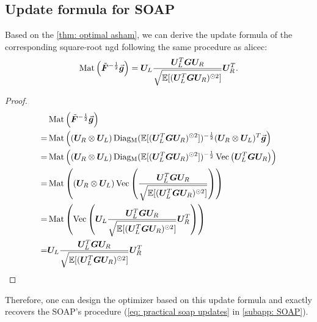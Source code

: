 \subsection{Update formula for SOAP}
\label{subapp: update formula for SOAP}
Based on the \cref{thm: optimal asham}, we can derive the update formula of the corresponding square-root \gls{ngd} following the same procedure as \gls{alicec}:
\begin{align*}
    \operatorname{Mat}\left(\tilde{\bm{F}}^{-\frac{1}{2}}\vec{\bm{g}}\right) = {\bm{U}}_L\frac{{\bm{U}}_L^T{\bm{G}}{\bm{U}}_R}{\sqrt{\mathbb{E}[({\bm{U}}_L^T{\bm{G}}{\bm{U}}_R)^{\odot 2}]}}{\bm{U}}_R^T.
\end{align*}
\begin{proof}
    \begin{align*}
        &\operatorname{Mat}\left(\tilde{\bm{F}}^{-\frac{1}{2}}\vec{\bm{g}}\right)\\
        =&\operatorname{Mat}\left(({\bm{U}}_R\otimes{\bm{U}}_L)\operatorname{Diag_M}(\mathbb{E}[({\bm{U}}_L^T{\bm{G}}{\bm{U}}_R)^{\odot 2}])^{-\frac{1}{2}}({\bm{U}}_R\otimes{\bm{U}}_L)^T\vec{\bm{g}}\right)\\
        =&\operatorname{Mat}\left(({\bm{U}}_R\otimes{\bm{U}}_L)\operatorname{Diag_M}(\mathbb{E}[({\bm{U}}_L^T{\bm{G}}{\bm{U}}_R)^{\odot 2}])^{-\frac{1}{2}}\operatorname{Vec}\left({\bm{U}}_L^T{\bm{G}}{\bm{U}}_R\right)\right)\\
        =&\operatorname{Mat}\left(({\bm{U}}_R\otimes{\bm{U}}_L)\operatorname{Vec}\left(\frac{{\bm{U}}_L^T{\bm{G}}{\bm{U}}_R}{\sqrt{\mathbb{E}[({\bm{U}}_L^T{\bm{G}}{\bm{U}}_R)^{\odot 2}]}}\right)\right)\\
        =&\operatorname{Mat}\left(\operatorname{Vec}\left({\bm{U}}_L\frac{{\bm{U}}_L^T{\bm{G}}{\bm{U}}_R}{\sqrt{\mathbb{E}[({\bm{U}}_L^T{\bm{G}}{\bm{U}}_R)^{\odot 2}]}}{\bm{U}}_R^T\right)\right)\\
        =&{\bm{U}}_L\frac{{\bm{U}}_L^T{\bm{G}}{\bm{U}}_R}{\sqrt{\mathbb{E}[({\bm{U}}_L^T{\bm{G}}{\bm{U}}_R)^{\odot 2}]}}{\bm{U}}_R^T
    \end{align*}
\end{proof}
Therefore, one can design the optimizer based on this update formula and exactly recovers the SOAP's procedure (\cref{eq: practical soap updates} in \cref{subapp: SOAP}).

